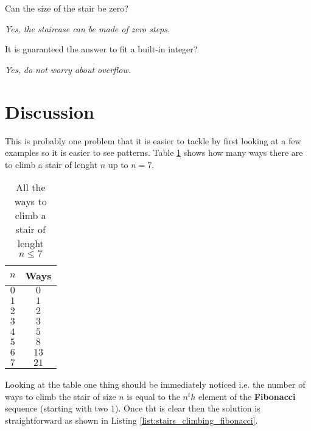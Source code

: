 \begin{QandA}
	\item Can the size of the stair be zero?
	\begin{answered}
		\textit{Yes, the staircase can be made of zero steps.}
	\end{answered}
	
	\item It is guaranteed the answer to fit a built-in integer?
	\begin{answered}
		\textit{Yes, do not worry about overflow.}
	\end{answered}

\end{QandA}

\section{Discussion}
\label{stairs_climbing:sec:discussion}

This is probably one problem that it is easier to tackle by first looking at a few examples so it is easier to see patterns. Table \ref{tab:stairs_climbing_ways_up_tp_7} shows  how many ways there are to climb a stair of lenght $n$ up to $n=7$.

\begin{table}
	\centering
	\begin{tabular}{|c|c|}
		\hline
		$n$ & \textbf{Ways} \\ \hline
		$0$ & $0$ \\ \hline
		$1$ & $1$ \\ \hline
		$2$ & $2$ \\ \hline
		$3$ & $3$ \\ \hline
		$4$ & $5$ \\ \hline
		$5$ & $8$ \\ \hline
		$6$ & $13$ \\ \hline
		$7$ & $21$ \\ \hline
	\end{tabular}
\label{tab:stairs_climbing_ways_up_tp_7}
\caption{All the ways to climb a stair of lenght $n \leq 7$ }
\end{table}

Looking at the table one thing should be immediately noticed i.e. the number of ways to climb the stair of size $n$ is equal to the $n^th$ element of the \textbf{Fibonacci} sequence (starting with two $1$).
Once tht is clear then the solution is straightforward as shown in Listing \ref{list:stairs_climbing_fibonacci}.

